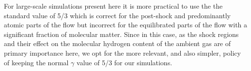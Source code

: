 \documentclass[useAMS,usenatbib]{mn2e}
\begin{document}
For large-scale simulations present here it is more practical to use
the the standard value of 5/3 which is correct for the post-shock 
and predominantly atomic parts of the flow but incorrect for the
equilibrated parts of the flow with a significant fraction of molecular matter.
Since in this case, as the shock regions and their effect on the molecular hydrogen content of 
the ambient gas are of primary importance here, we opt for the more
relevant, and also simpler, policy of keeping the normal $\gamma$
value of 5/3 for our simulations. 



   
 



\label{lastpage}
\end{document}
